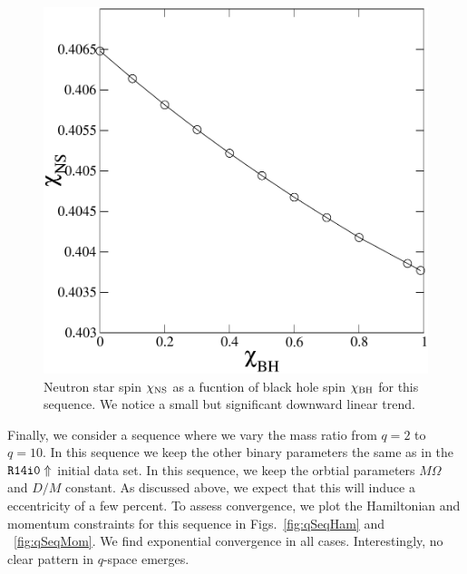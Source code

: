 \begin{figure}
\includegraphics[width=0.95\columnwidth]{chap4/chichi}
\caption[]{\label{fig:chichi}Neutron star spin $\chi_{\rm NS}$ as a fucntion of black hole spin $\chi_{\rm BH}$ for this sequence. We notice a small but significant downward linear trend. }
\end{figure}




Finally, we consider a sequence where we vary the mass ratio from
$q=2$ to $q=10$. In this sequence we keep the other binary parameters
the same as in the ${\tt R14i0\Uparrow}$ initial data set. In this sequence, we keep the
orbtial parameters $M\Omega$ and $D/M$ constant. As discussed above,
we expect that this will induce a eccentricity of a few percent. To
assess convergence, we plot the Hamiltonian and momentum constraints
for this sequence in Figs.~\ref{fig:qSeqHam} and
~\ref{fig:qSeqMom}. We find exponential convergence in all
cases. Interestingly, no clear pattern in $q$-space emerges.

